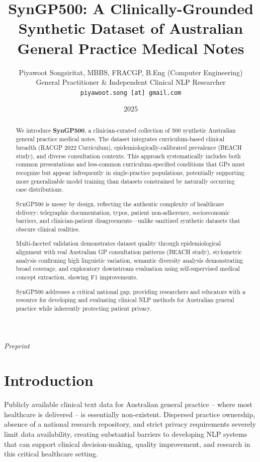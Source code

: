 \documentclass[11pt]{article}
\title{\textbf{SynGP500: A Clinically-Grounded Synthetic Dataset of Australian General Practice Medical Notes}}
\author{
    Piyawoot Songsiritat, MBBS, FRACGP, B.Eng (Computer Engineering)\\
    General Practitioner \& Independent Clinical NLP Researcher\\
    \texttt{piyawoot.song [at] gmail.com}
}
\date{2025}
\begin{document}
\maketitle

\noindent\textit{Preprint}

\begin{abstract}
We introduce \textbf{SynGP500}, a clinician-curated collection of 500 synthetic Australian general practice medical notes. The dataset integrates curriculum-based clinical breadth (RACGP 2022 Curriculum), epidemiologically-calibrated prevalence (BEACH study), and diverse consultation contexts. This approach systematically includes both common presentations and less-common curriculum-specified conditions that GPs must recognize but appear infrequently in single-practice populations, potentially supporting more generalizable model training than datasets constrained by naturally occurring case distributions.

SynGP500 is messy by design, reflecting the authentic complexity of healthcare delivery: telegraphic documentation, typos, patient non-adherence, socioeconomic barriers, and clinician-patient disagreements—unlike sanitized synthetic datasets that obscure clinical realities.

Multi-faceted validation demonstrates dataset quality through epidemiological alignment with real Australian GP consultation patterns (BEACH study), stylometric analysis confirming high linguistic variation, semantic diversity analysis demonstrating broad coverage, and exploratory downstream evaluation using self-supervised medical concept extraction, showing F1 improvements.

SynGP500 addresses a critical national gap, providing researchers and educators with a resource for developing and evaluating clinical NLP methods for Australian general practice while inherently protecting patient privacy.
\end{abstract}

\section{Introduction}

Publicly available clinical text data for Australian general practice -- where most healthcare is delivered -- is essentially non-existent. Dispersed practice ownership, absence of a national research repository, and strict privacy requirements severely limit data availability, creating substantial barriers to developing NLP systems that can support clinical decision-making, quality improvement, and research in this critical healthcare setting.
\end{document}
